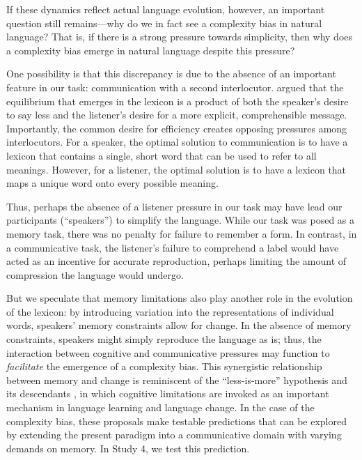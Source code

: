 If these dynamics reflect actual language evolution, however, an important question still remains---why do we in fact see a complexity bias in natural language? That is, if there is a strong pressure towards simplicity, then why does a complexity bias emerge in natural language despite this pressure? 

One possibility is that this discrepancy is due to the absence of an important feature in our task: communication with a second interlocutor.  argued that the equilibrium that emerges in the lexicon is a product of both the speaker's desire to say less and the listener's desire for a more explicit, comprehensible message. Importantly, the common desire for efficiency creates opposing pressures among interlocutors. For a speaker, the optimal solution to communication is to have a lexicon that contains a single, short word that can be used to refer to all meanings. However, for a listener, the optimal solution is to have a lexicon that maps a unique word onto every possible meaning. 

Thus, perhaps the absence of a listener pressure in our task may have lead our participants (``speakers'') to simplify the language. While our task was posed as a memory task, there was no penalty for failure to remember a form. In contrast, in a communicative task, the listener's failure to comprehend a label would have acted as an incentive for accurate reproduction, perhaps limiting the amount of compression the language would undergo. 



But we speculate that memory limitations also play another role in the evolution of the lexicon: by introducing variation into the representations of individual words, speakers' memory constraints allow for change. In the absence of memory constraints, speakers might simply reproduce the language as is; thus, the interaction between cognitive and communicative pressures may function to {\it facilitate} the emergence of a complexity bias. 
This synergistic relationship between memory and change is reminiscent of the ``less-is-more'' hypothesis and its descendants \cite{newport1990maturational,hudson-kam2005}, in which cognitive limitations are invoked as an important mechanism in language learning and language change. In the case of the complexity bias, these proposals make testable predictions that can be explored by extending the present paradigm into a communicative domain with varying demands on memory. In Study 4, we test this prediction.



